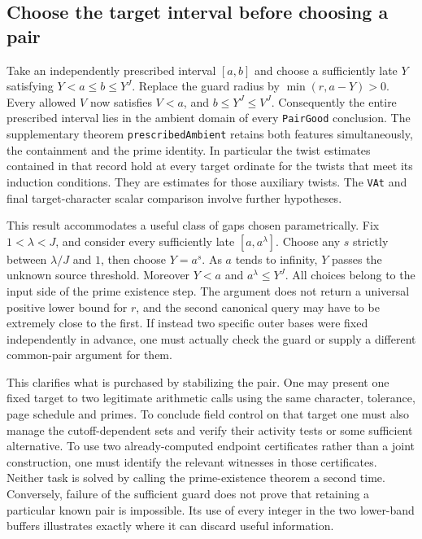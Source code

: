 \documentclass[12pt,letterpaper]{article}
\begin{document}
\subsection{Choose the target interval before choosing a pair}

Take an independently prescribed interval \([a,b]\) and choose a sufficiently late \(Y\) satisfying \(Y<a\le b\le Y^J\). Replace the guard radius by \(\min(r,a-Y)>0\). Every allowed \(V\) now satisfies \(V<a\), and \(b\le Y^J\le V^J\). Consequently the entire prescribed interval lies in the ambient domain of every \texttt{PairGood} conclusion. The supplementary theorem \texttt{prescribedAmbient} retains both features simultaneously, the containment and the prime identity. In particular the twist estimates contained in that record hold at every target ordinate for the twists that meet its induction conditions. They are estimates for those auxiliary twists. The \texttt{VAt} and final target-character scalar comparison involve further hypotheses.

This result accommodates a useful class of gaps chosen parametrically. Fix \(1<\lambda<J\), and consider every sufficiently late \([a,a^\lambda]\). Choose any \(s\) strictly between \(\lambda/J\) and \(1\), then choose \(Y=a^s\). As \(a\) tends to infinity, \(Y\) passes the unknown source threshold. Moreover \(Y<a\) and \(a^\lambda\le Y^J\). All choices belong to the input side of the prime existence step. The argument does not return a universal positive lower bound for \(r\), and the second canonical query may have to be extremely close to the first. If instead two specific outer bases were fixed independently in advance, one must actually check the guard or supply a different common-pair argument for them.

This clarifies what is purchased by stabilizing the pair. One may present one fixed target to two legitimate arithmetic calls using the same character, tolerance, page schedule and primes. To conclude field control on that target one must also manage the cutoff-dependent sets and verify their activity tests or some sufficient alternative. To use two already-computed endpoint certificates rather than a joint construction, one must identify the relevant witnesses in those certificates. Neither task is solved by calling the prime-existence theorem a second time. Conversely, failure of the sufficient guard does not prove that retaining a particular known pair is impossible. Its use of every integer in the two lower-band buffers illustrates exactly where it can discard useful information.
\end{document}
